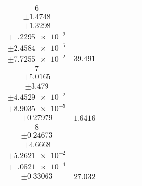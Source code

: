 \documentclass[8pt]{article}
\begin{document}
\begin{longtable}[l]{c c c c c c c}
$\num{6}$ & \begin{tabular}[c]{@{}c@{}}$\num{116.08}$ \\ $\pm\num{1.4748}$\end{tabular} & \begin{tabular}[c]{@{}c@{}}$\num{-0.4023}$ \\ $\pm\num{1.3298}$\end{tabular} & \begin{tabular}[c]{@{}c@{}}$\num{2.619e+3}$ \\ $\pm\num{1.2295e-2}$\end{tabular} & \begin{tabular}[c]{@{}c@{}}$\num{5.2366}$ \\ $\pm\num{2.4584e-5}$\end{tabular} & \begin{tabular}[c]{@{}c@{}}$\num{6.2905}$ \\ $\pm\num{7.7255e-2}$\end{tabular} & $\num{39.491}$\\
$\num{7}$ & \begin{tabular}[c]{@{}c@{}}$\num{5.1182}$ \\ $\pm\num{5.0165}$\end{tabular} & \begin{tabular}[c]{@{}c@{}}$\num{3.0826e-2}$ \\ $\pm\num{3.479}$\end{tabular} & \begin{tabular}[c]{@{}c@{}}$\num{2.6217e+3}$ \\ $\pm\num{4.4529e-2}$\end{tabular} & \begin{tabular}[c]{@{}c@{}}$\num{5.2421}$ \\ $\pm\num{8.9035e-5}$\end{tabular} & \begin{tabular}[c]{@{}c@{}}$\num{10.473}$ \\ $\pm\num{0.27979}$\end{tabular} & $\num{1.6416}$\\
$\num{8}$ & \begin{tabular}[c]{@{}c@{}}$\num{82.616}$ \\ $\pm\num{0.24673}$\end{tabular} & \begin{tabular}[c]{@{}c@{}}$\num{-0.348}$ \\ $\pm\num{4.6668}$\end{tabular} & \begin{tabular}[c]{@{}c@{}}$\num{2.6261e+3}$ \\ $\pm\num{5.2621e-2}$\end{tabular} & \begin{tabular}[c]{@{}c@{}}$\num{5.2509}$ \\ $\pm\num{1.0521e-4}$\end{tabular} & \begin{tabular}[c]{@{}c@{}}$\num{8.8399}$ \\ $\pm\num{0.33063}$\end{tabular} & $\num{27.032}$\\

\end{longtable}
\end{document}
